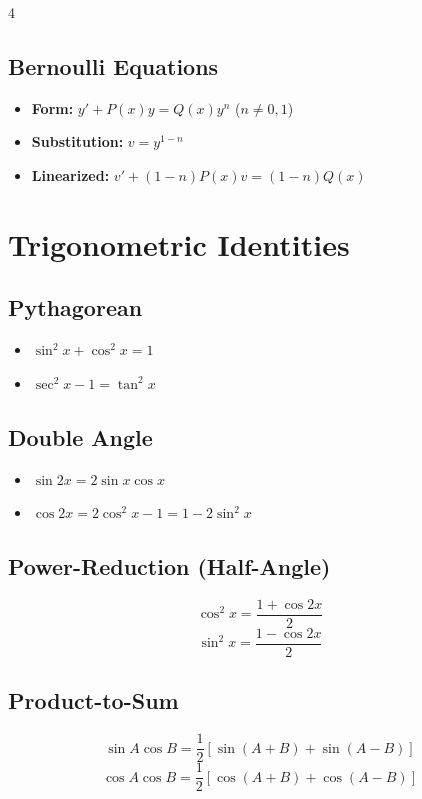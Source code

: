 \documentclass[8pt, landscape, a4paper]{scrartcl}
\begin{document}
\begin{multicols*}{4}
\subsection*{Bernoulli Equations}
\begin{itemize}
    \item \textbf{Form:} $y' + P(x)y = Q(x)y^n$ ($n \neq 0, 1$)
    \item \textbf{Substitution:} $v = y^{1-n}$
    \item \textbf{Linearized:} $v' + (1-n)P(x)v = (1-n)Q(x)$
\end{itemize}

\section*{Trigonometric Identities}
\subsection*{Pythagorean}
\begin{itemize}
    \item $\sin^2 x + \cos^2 x = 1$
    \item $\sec^2 x - 1 = \tan^2 x$
\end{itemize}

\subsection*{Double Angle}
\begin{itemize}
    \item $\sin 2x = 2 \sin x \cos x$
    \item $\cos 2x = 2 \cos^2 x - 1 = 1 - 2 \sin^2 x$
\end{itemize}

\subsection*{Power-Reduction (Half-Angle)}
\[
    \cos^2 x = \frac{1 + \cos 2x}{2}
\]
\[
    \sin^2 x = \frac{1 - \cos 2x}{2}
\]

\subsection*{Product-to-Sum}
\[
    \sin A \cos B = \frac{1}{2}\left[\sin(A+B) + \sin(A-B)\right]
\]
\[
    \cos A \cos B = \frac{1}{2}\left[\cos(A+B) + \cos(A-B)\right]
\]


\end{multicols*}
\end{document}
